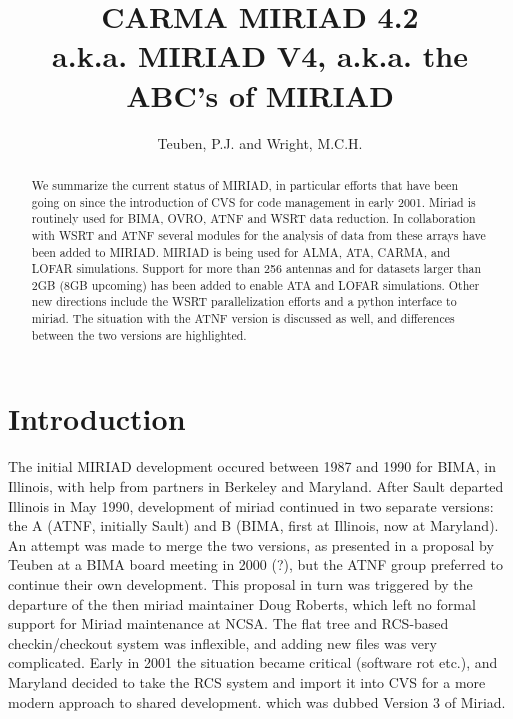


\title{
{\Large  {\bf CARMA MIRIAD 4.2} } \\
{\footnotesize a.k.a. MIRIAD V4, a.k.a. the ABC's of MIRIAD}}
\medskip

\author{ Teuben, P.J. and Wright, M.C.H.}


\begin{abstract}
 
We summarize the current status of MIRIAD, in particular efforts that
have been going on since the introduction of CVS for code
management in early 2001.  Miriad
is routinely used for BIMA, OVRO, ATNF and WSRT data reduction.  In
collaboration with WSRT and ATNF several modules for the analysis of
data from these arrays have been added to MIRIAD.  MIRIAD is being used
for ALMA, ATA, CARMA, and LOFAR simulations.  Support for more than 256
antennas and for datasets larger than 2GB (8GB upcoming) has been added
to enable ATA and LOFAR simulations. Other new directions include
the WSRT parallelization efforts and a python interface to miriad.
The situation with the ATNF version is discussed as well, and differences
between the two versions are highlighted.


\end{abstract}

\section{Introduction}

The initial MIRIAD development occured between 1987 and 1990 for BIMA,
in Illinois, with help from partners in Berkeley and Maryland.
After Sault departed Illinois in May 1990, development of 
miriad continued in two separate versions: the A (ATNF, initially
Sault) and B (BIMA,  first at Illinois, now at Maryland). An attempt was made
to merge the two versions,
as presented in a proposal by Teuben at a BIMA board meeting in 2000 (?), but
the ATNF group preferred to continue their own development. This proposal
in turn was triggered by the departure of the then miriad maintainer
Doug Roberts, which left no formal support for Miriad maintenance at NCSA. 
The flat tree and RCS-based checkin/checkout system was 
inflexible, and adding new files was very complicated.
Early in 2001 the situation became critical (software rot etc.), and 
Maryland decided to take the RCS
system and import it into CVS for a more modern approach to shared
development. which was dubbed Version 3 of Miriad.

